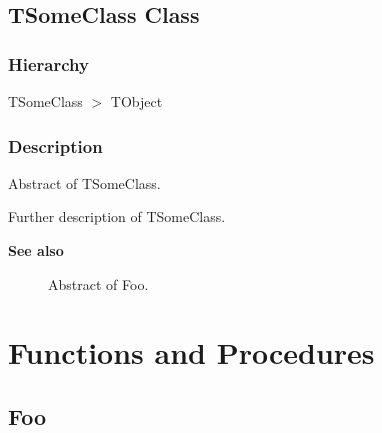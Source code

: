 \documentclass{report}
\newif\ifpdf
\begin{document}
\subsection*{TSomeClass Class}
\fi
\label{ok_see_also.TSomeClass}
\subsubsection*{\large{\textbf{Hierarchy}}\normalsize\hspace{1ex}\hfill}
TSomeClass {$>$} TObject
\subsubsection*{\large{\textbf{Description}}\normalsize\hspace{1ex}\hfill}
Abstract of TSomeClass.\hfill\vspace*{1ex}

 Further description of TSomeClass.  \begin{list}{}{
\setlength{\itemindent}{0cm}
\setlength{\listparindent}{0cm}
\setlength{\leftmargin}{\evensidemargin}
\addtolength{\leftmargin}{\tmplength}
\settowidth{\labelsep}{X}
\addtolength{\leftmargin}{\labelsep}
\setlength{\labelwidth}{\tmplength}
}
\item[\textbf{See also}]
\begin{description}
\item[\begin{ttfamily}Foo\end{ttfamily}(\ref{ok_see_also-Foo})] 
Abstract of Foo.
\item[\begin{ttfamily}ok{\_}see{\_}also unit\end{ttfamily}(\ref{ok_see_also})] 

\end{description}
\end{list}
\section{Functions and Procedures}
\ifpdf
\subsection*{\large{\textbf{Foo}}\normalsize\hspace{1ex}\hrulefill}
\else
\end{document}
